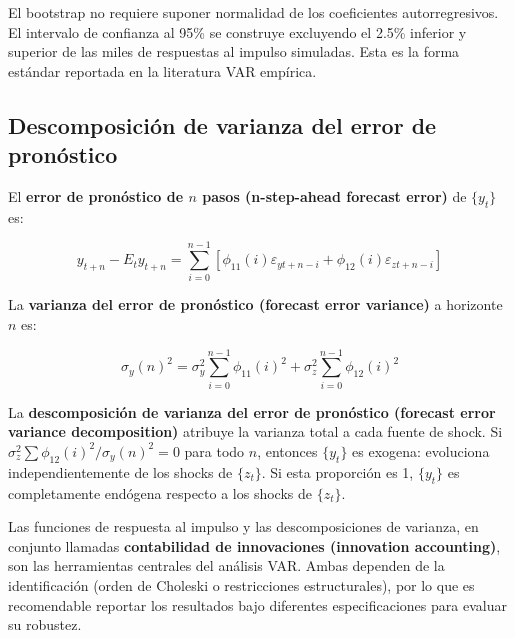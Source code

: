 \documentclass[12pt]{article}
\begin{document}
\begin{intuicion}
El bootstrap no requiere suponer normalidad de los coeficientes autorregresivos. El intervalo de confianza al 95\% se construye excluyendo el 2.5\% inferior y superior de las miles de respuestas al impulso simuladas. Esta es la forma est\'andar reportada en la literatura VAR emp\'irica.
\end{intuicion}

\subsection{Descomposici\'on de varianza del error de pron\'ostico}

El \textbf{error de pron\'ostico de $n$ pasos (n-step-ahead forecast error)} de $\{y_t\}$ es:

\begin{equation}
y_{t+n} - E_t y_{t+n} = \sum_{i=0}^{n-1}\left[\phi_{11}(i)\varepsilon_{yt+n-i} + \phi_{12}(i)\varepsilon_{zt+n-i}\right]
\end{equation}

La \textbf{varianza del error de pron\'ostico (forecast error variance)} a horizonte $n$ es:

\begin{equation}
\sigma_y(n)^2 = \sigma_y^2\sum_{i=0}^{n-1}\phi_{11}(i)^2 + \sigma_z^2\sum_{i=0}^{n-1}\phi_{12}(i)^2
\end{equation}

\begin{intuicionmat}
La \textbf{descomposici\'on de varianza del error de pron\'ostico (forecast error variance decomposition)} atribuye la varianza total a cada fuente de shock. Si $\sigma_z^2\sum\phi_{12}(i)^2 / \sigma_y(n)^2 = 0$ para todo $n$, entonces $\{y_t\}$ es exogena: evoluciona independientemente de los shocks de $\{z_t\}$. Si esta proporci\'on es 1, $\{y_t\}$ es completamente end\'ogena respecto a los shocks de $\{z_t\}$.
\end{intuicionmat}

\begin{intuicion}
Las funciones de respuesta al impulso y las descomposiciones de varianza, en conjunto llamadas \textbf{contabilidad de innovaciones (innovation accounting)}, son las herramientas centrales del an\'alisis VAR. Ambas dependen de la identificaci\'on (orden de Choleski o restricciones estructurales), por lo que es recomendable reportar los resultados bajo diferentes especificaciones para evaluar su robustez.
\end{intuicion}
\end{document}
